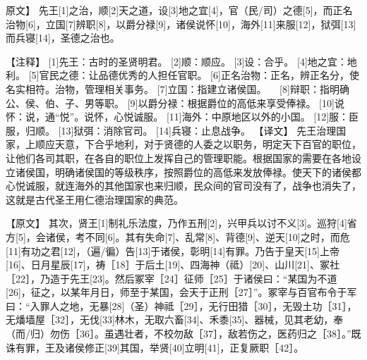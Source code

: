 \documentclass[a4paper,12pt,UTF8,twoside]{ctexbook}
\begin{document}
原文】
先王[1]之治，顺[2]天之道，设[3]地之宜[4]，官（民/司）之德[5]，而正名治物[6]，立国[7]辨职[8]，以爵分禄[9]，诸侯说怀[10]，海外[11]来服[12]，狱弭[13]而兵寝[14]，圣德之治也。

【注释】
[1]先王：古时的圣贤明君。
[2]顺：顺应。
[3]设：合乎。
[4]地之宜：地利。
[5]官民之德：让品德优秀的人担任官职。
[6]正名治物：正名，辨正名分，使名实相符。治物，管理相关事务。
[7]立国：指建立诸侯国。
　[8]辩职：指明确公、侯、伯、子、男等职。
[9]以爵分禄：根据爵位的高低来享受俸禄。
[10]说怀：说，通“悦”。说怀，心悦诚服。
[11]海外：中原地区以外的小国。
[12]服：臣服，归顺。
[13]狱弭：消除官司。
[14]兵寝：止息战争。
【译文】
先王治理国家，上顺应天意，下合乎地利，对于贤德的人委之以职务，明定天下百官的职位，让他们各司其职，在各自的职位上发挥自己的管理职能。根据国家的需要在各地设立诸侯国，明确诸侯国的等级秩序，按照爵位的高低来发放俸禄。使天下的诸侯都心悦诚服，就连海外的其他国家也来归顺，民众间的官司没有了，战争也消失了，这就是古代圣王用仁德治理国家的典范。

【原文】
其次，贤王[1]制礼乐法度，乃作五刑[2]，兴甲兵以讨不义[3]。巡狩[4]省方[5]，会诸侯，考不同[6]。其有失命[7]、乱常[8]、背德[9]、逆天[10]之时，而危[11]有功之君[12]，（遍/徧）告[13]于诸侯，彰明[14]有罪。乃告于皇天[15]上帝[16]、日月星辰[17]，祷［18］于后土[19]、四海神（祗）[20]、山川[21]、冢社［22］，乃造于先王[23]。然后冢宰［24］征师［25］于诸侯曰：“某国为不道[26]，征之，以某年月日，师至于某国，会天于正刑［27］”。冢宰与百官布令于军曰：“入罪人之地，无暴[28]（圣）神祗［29］，无行田猎［30］，无毁土功［31］，无燔墙屋［32］，无伐[33]林木，无取六畜[34]、禾黍[35]、器械，见其老幼，奉（而/归）勿伤［36］。虽遇壮者，不校勿敌［37］，敌若伤之，医药归之［38］。”既诛有罪，王及诸侯修正[39]其国，举贤[40]立明[41]，正复厥职［42］。
\end{document}
